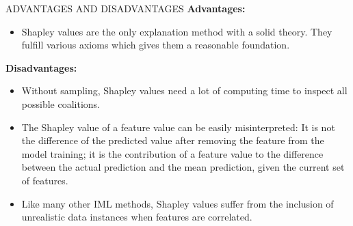 \documentclass[11pt,compress,t,notes=noshow, aspectratio=169, xcolor=table]{beamer}
\begin{document}

\begin{vbframe}{ADVANTAGES AND DISADVANTAGES}
	\textbf{Advantages:}
	\begin{itemize}
		\item 	Shapley values are the only explanation method with a solid
		theory. They fulfill various axioms which gives them a reasonable
		foundation.
	\end{itemize}
\vspace{0.25cm}
	\textbf{Disadvantages:}
	\begin{itemize}
		\item 	Without sampling, Shapley values need a lot of computing time to
		inspect all possible coalitions.
		\item The Shapley value of a feature value can be easily misinterpreted:
		It is not the difference of the predicted value after removing the
		feature from the model training; it is the contribution of a feature
		value to the difference between the actual prediction and the mean
		prediction, given the current set of features.
		\item Like many other IML methods, Shapley values suffer from the
		inclusion of unrealistic data instances when features are
		correlated.
	\end{itemize}



\end{vbframe}

\endlecture
\end{document}
